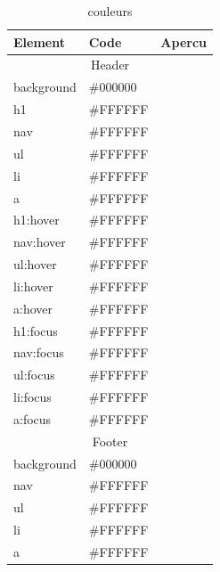 \documentclass[letter, 10pt]{report}
\begin{document}
\begin{table}[h!]
	\caption{couleurs}
	\begin{center}
		\begin{tabular}{|l|l|l|}
		\hline
		Element    					& Code     & Apercu \\ \hline
		\multicolumn{3}{|c|}{Header} \\ \hline
		background 					& \#000000 & \cellcolor[HTML]{000000} \\ \hline
		h1         					& \#FFFFFF & \cellcolor[HTML]{FFFFFF} \\ \hline
		nav        					& \#FFFFFF & \cellcolor[HTML]{FFFFFF} \\ \hline
		ul         					& \#FFFFFF & \cellcolor[HTML]{FFFFFF} \\ \hline
		li         					& \#FFFFFF & \cellcolor[HTML]{FFFFFF} \\ \hline
		a          					& \#FFFFFF & \cellcolor[HTML]{FFFFFF} \\ \hline
		h1:hover   					& \#FFFFFF & \cellcolor[HTML]{FFFFFF} \\ \hline
		nav:hover  					& \#FFFFFF & \cellcolor[HTML]{FFFFFF} \\ \hline
		ul:hover   					& \#FFFFFF & \cellcolor[HTML]{FFFFFF} \\ \hline
		li:hover   					& \#FFFFFF & \cellcolor[HTML]{FFFFFF} \\ \hline
		a:hover    					& \#FFFFFF & \cellcolor[HTML]{FFFFFF} \\ \hline
		h1:focus   					& \#FFFFFF & \cellcolor[HTML]{FFFFFF} \\ \hline
		nav:focus  					& \#FFFFFF & \cellcolor[HTML]{FFFFFF} \\ \hline
		ul:focus   					& \#FFFFFF & \cellcolor[HTML]{FFFFFF} \\ \hline
		li:focus   					& \#FFFFFF & \cellcolor[HTML]{FFFFFF} \\ \hline
		a:focus    					& \#FFFFFF & \cellcolor[HTML]{FFFFFF} \\ \hline
		\multicolumn{3}{|c|}{Footer} \\ \hline
		background 					& \#000000 & \cellcolor[HTML]{000000} \\ \hline
		nav        					& \#FFFFFF & \cellcolor[HTML]{FFFFFF} \\ \hline
		ul         					& \#FFFFFF & \cellcolor[HTML]{FFFFFF} \\ \hline
		li         					& \#FFFFFF & \cellcolor[HTML]{FFFFFF} \\ \hline
		a          					& \#FFFFFF & \cellcolor[HTML]{FFFFFF} \\ \hline

\end{tabular}
\end{center}
\end{table}
\end{document}
